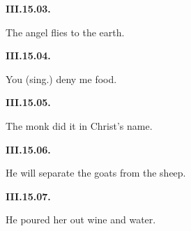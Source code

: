 \par\begin{minipage}{\linewidth}\raggedright
\textbf{III.15.03.}

The angel flies to the earth.

\end{minipage}\par\addvspace{4pt}

\par\begin{minipage}{\linewidth}\raggedright
\textbf{III.15.04.}

You (sing.) deny me food.

\end{minipage}\par\addvspace{4pt}

\par\begin{minipage}{\linewidth}\raggedright
\textbf{III.15.05.}

The monk did it in Christ’s name.

\end{minipage}\par\addvspace{4pt}

\par\begin{minipage}{\linewidth}\raggedright
\textbf{III.15.06.}

He will separate the goats from the sheep.

\end{minipage}\par\addvspace{4pt}

\par\begin{minipage}{\linewidth}\raggedright
\textbf{III.15.07.}

He poured her out wine and water.

\end{minipage}\par\addvspace{4pt}

